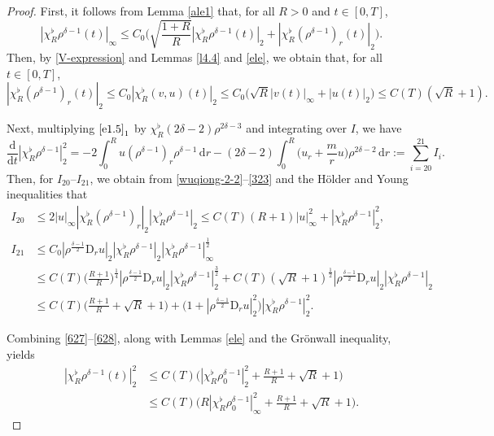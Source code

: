 \documentclass[11pt,reqno]{amsart}
\numberwithin{rk}{section}
\numberwithin{prop}{section}
\numberwithin{mydef}{section}
\numberwithin{lem}{section}
\numberwithin{equation}{section}
\numberwithin{thm}{section}
\begin{document}
\begin{proof}
First, it follows from Lemma \ref{ale1} that, for all $R>0$ and $t\in [0,T]$,
\begin{equation}\label{wuqiong-2-2}
|\chi_R^\flat\rho^{\delta-1}(t)|_\infty\leq C_0\Big(\sqrt{\frac{1+R}{R}} |\chi_R^\flat\rho^{\delta-1}(t)|_2+|\chi_R^\flat(\rho^{\delta-1})_r(t)|_2\Big).
\end{equation}
Then, by  \eqref{V-expression} and Lemmas \ref{l4.4} and \ref{ele}, we obtain that, for all $t\in [0,T]$,
\begin{equation}\label{323}
|\chi_R^\flat (\rho^{\delta-1})_r(t)|_2\leq C_0|\chi_R^\flat (v,u)(t)|_2 \leq C_0\big(\sqrt{R}|v(t)|_\infty+ |u(t)|_2\big)\leq C(T)(\sqrt{R}+1).
\end{equation}

Next, multiplying $\eqref{e1.5}_1$ by $\chi_R^\flat (2\delta-2)\rho^{2\delta-3}$ and integrating over $I$,  we have
\begin{equation}\label{627}
\frac{\mathrm{d}}{\mathrm{d}t}|\chi_R^\flat \rho^{\delta-1}|_2^2=-2\int_0^R  u(\rho^{\delta-1})_r\rho^{\delta-1}\,\mathrm{d}r-(2\delta-2) \int_0^R \big(u_r+\frac{m}{r}u\big)\rho^{2\delta-2}\,\mathrm{d}r:=\sum_{i=20}^{21}I_{i}.
\end{equation}
Then, for $I_{20}$--$I_{21}$, we obtain from \eqref{wuqiong-2-2}--\eqref{323} and the H\"older and Young inequalities that
\begin{equation}\label{628}
\begin{aligned}
I_{20}&\leq 2|u|_\infty|\chi_R^\flat(\rho^{\delta-1})_r|_2|\chi_R^\flat\rho^{\delta-1}|_2\leq C(T)(R+1)|u|_\infty^2+|\chi_R^\flat\rho^{\delta-1}|_2^2,\\
I_{21}&\leq C_0 |\rho^\frac{\delta-1}{2}\mathrm{D}_r u|_2|\chi_R^\flat \rho^{\delta-1}|_2|\chi_R^\flat \rho^{\delta-1}|_\infty^\frac{1}{2} \\
&\leq C(T) \Big(\frac{R+1}{R}\Big)^\frac{1}{4} |\rho^\frac{\delta-1}{2}\mathrm{D}_r u|_2|\chi_R^\flat \rho^{\delta-1}|_2^\frac{3}{2} + C(T) (\sqrt{R}+1)^\frac{1}{2} |\rho^\frac{\delta-1}{2}\mathrm{D}_r u|_2|\chi_R^\flat \rho^{\delta-1}|_2\\
&\leq C(T)\Big(\frac{R+1}{R}+\sqrt{R}+1\Big) + \big(1+ |\rho^\frac{\delta-1}{2}\mathrm{D}_r u|_2^2 \big)|\chi_R^\flat \rho^{\delta-1}|_2^2.
\end{aligned}
\end{equation}

Combining \eqref{627}--\eqref{628}, along with Lemmas \ref{ele} and the Gr\"onwall inequality, yields
\begin{equation}\label{324}
\begin{aligned}
|\chi_R^\flat\rho^{\delta-1}(t)|_2^2 &\leq C(T)\Big(|\chi_R^\flat \rho_0^{\delta-1}|_2^2+\frac{R+1}{R}+\sqrt{R}+1\Big)\\
&\leq C(T)\Big(R|\chi_R^\flat \rho_0^{\delta-1}|_\infty^2+\frac{R+1}{R}+\sqrt{R}+1\Big).
\end{aligned}
\end{equation}



\end{proof}
\end{document}
